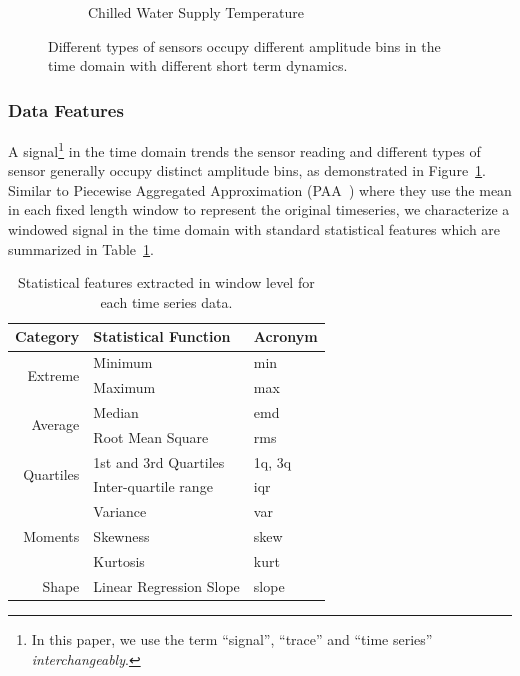 \begin{figure}[ht!]
\begin{subfigure}{0.32\textwidth}
                \caption{Chilled Water Supply Temperature}
  \end{subfigure}
\caption{Different types of sensors occupy different amplitude bins in the time domain with different short term dynamics.}
\label{fig:example}
\end{figure}

\subsubsection{Data Features}
A signal\footnote{In this paper, we use the term ``signal'', ``trace'' and ``time series'' \textit{interchangeably}.} in the time domain trends the sensor reading and different types of sensor generally occupy distinct amplitude bins, as demonstrated in Figure~\ref{fig:example}. 
Similar to Piecewise Aggregated Approximation (PAA~\cite{paa}) where they use the mean in each fixed length window to represent the original timeseries, we characterize a windowed signal in the time domain with standard statistical features which are summarized in Table~\ref{table:fd}.


\begin{table}[h]
\centering
\begin{tabular}{r|l|l}
\hline
Category                   & Statistical Function & \multicolumn{1}{l}{Acronym} \\ \hline\hline
\multirow{2}{*}{Extreme}   & Minimum                 & min                          \\ \cline{3-3} 
                           & Maximum                 & max                          \\ \hline
\multirow{2}{*}{Average}   & Median                  & emd                          \\ \cline{3-3} 
                           & Root Mean Square        & rms                          \\ \hline
\multirow{2}{*}{Quartiles} & 1st and 3rd Quartiles   & 1q, 3q                       \\ \cline{3-3} 
                           & Inter-quartile range    & iqr                          \\ \hline
\multirow{3}{*}{Moments}   & Variance                & var                          \\ \cline{3-3} 
                           & Skewness                & skew                         \\ \cline{3-3} 
                           & Kurtosis                & kurt                         \\ \hline
Shape                      & Linear Regression Slope & slope                        \\ \hline
\end{tabular}
\caption{Statistical features extracted in window level for each time series data.}
\label{table:fd}
\end{table}


